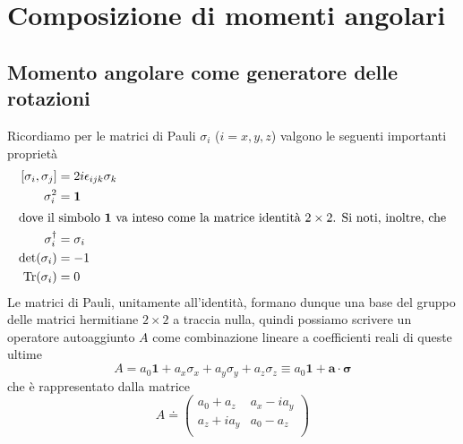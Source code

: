 


%

\chapter{Composizione di momenti angolari} %

\section[Generatore delle rotazioni]{Momento angolare come generatore delle rotazioni} %
Ricordiamo per le matrici di Pauli $\sigma_i$ ($i=x,y,z$) valgono le seguenti importanti proprietà
\begin{subequations} \label{eqn:pauli} \begin{align}
[\sigma_i,\sigma_j]&=2i\epsilon_{ijk}\sigma_k \\
\sigma_i^2&=\textbf{1} \\
\intertext{dove il simbolo $\textbf{1}$ va inteso come la matrice identità $2\times2$. Si noti, inoltre, che}
\sigma_i^\dagger&=\sigma_i \\
\det(\sigma_i)&=-1 \\
\operatorname{Tr}(\sigma_i)&=0 \label{eqn:pauli tr}
\end{align} \end{subequations}
Le matrici di Pauli, unitamente all'identità, formano dunque una base del gruppo delle matrici hermitiane $2\times 2$ a traccia nulla, quindi possiamo scrivere un operatore autoaggiunto $A$ come combinazione lineare a coefficienti reali di queste ultime
\begin{equation} \label{eqn:pauliautoaggiunto}
A=a_0\textbf{1}+a_x{\sigma}_x+a_y{\sigma}_y+a_z{\sigma}_z \equiv a_0\textbf{1}+\textbf{a}\cdot\boldsymbol\sigma
\end{equation}
che è rappresentato dalla matrice
\begin{equation} \label{eqn:matriceautoaggiunto}
A\doteq
\begin{pmatrix}
a_0+a_z & a_x-ia_y \\
a_z+ia_y & a_0-a_z \\
\end{pmatrix}
\end{equation}

